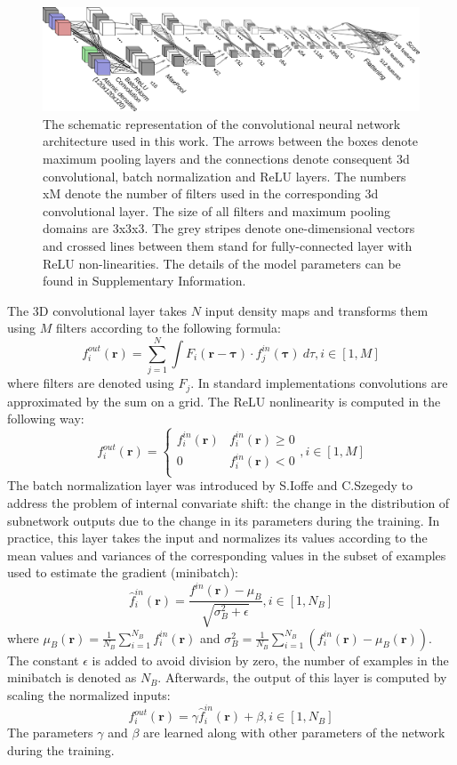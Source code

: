 \documentclass[a4paper,10pt]{article}
\begin{document}
\begin{figure}[H]
    \centering
    \includegraphics[width=\linewidth]{Fig/ConvnetDiagramV1.png}
    \caption{The schematic representation of the convolutional neural network architecture used in this work. 
    The arrows between the boxes denote maximum pooling layers and the connections denote 
    consequent 3d convolutional, batch normalization and ReLU layers. The numbers xM denote the number of filters 
    used in the corresponding 3d convolutional layer. The size of all filters and 
    maximum pooling domains are 3x3x3. The grey stripes denote one-dimensional vectors and crossed lines between them 
    stand for fully-connected layer with ReLU non-linearities. The details of the model parameters can be found in 
    Supplementary Information.}
    \label{Fig:CNNModel}
\end{figure}

The 3D convolutional layer takes $N$ input density maps and transforms them using $M$ filters
according to the following formula:
$$
f^{out}_i (\mathbf{r}) = \sum^{N}_{j=1} \int F_i (\mathbf{r} - \mathbf{\tau}) \cdot f^{in}_j(\mathbf{\tau}) ~d\tau, i \in [1,M]
$$
where filters are denoted using $F_j$. In standard implementations convolutions are approximated by the sum on a grid.
The ReLU nonlinearity is computed in the following way:
$$
f^{out}_i (\mathbf{r}) = \begin{cases}
               f^{in}_i(\mathbf{r})& f^{in}_i(\mathbf{r})\geq 0\\
               0                 &f^{in}_i(\mathbf{r})<0\\
            \end{cases}, i \in [1,M]
$$
The batch normalization layer was introduced by S.Ioffe and C.Szegedy \cite{ioffe2015batch} to address the problem of internal convariate shift:
the change in the distribution of subnetwork outputs due to the change in its parameters during the training. In practice, this layer takes the 
input and normalizes its values according to the mean values and variances of the corresponding values in the subset of examples used to estimate 
the gradient (minibatch):
$$
    \hat{f}^{in}_i(\mathbf{r}) = \frac{f^{in}(\mathbf{r}) - \mu_{B}}{\sqrt{\sigma^{2}_{B} + \epsilon}}, i \in [1,N_B]
$$
where $\mu_B(\mathbf{r}) = \frac{1}{N_B} \sum_{i=1}^{N_B} f^{in}_i(\mathbf{r})$ and 
$\sigma^{2}_{B} = \frac{1}{N_B} \sum_{i=1}^{N_B} \left( f^{in}_i(\mathbf{r}) - \mu_B (\mathbf{r}) \right)$. 
The constant $\epsilon$ is added to avoid division by zero, the number of 
examples in the minibatch is denoted as $N_B$. Afterwards, the output of this layer is computed by scaling the normalized inputs:
$$
f^{out}_i(\mathbf{r}) = \gamma \hat{f}^{in}_i(\mathbf{r}) + \beta, i \in [1,N_B]
$$
The parameters $\gamma$ and $\beta$ are learned along with other parameters of the network during the training.
\end{document}
